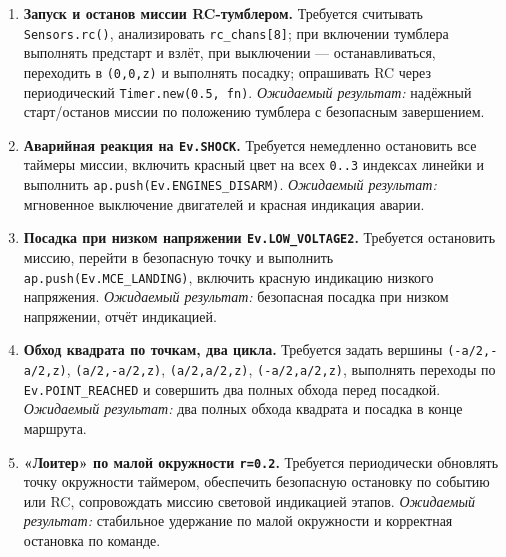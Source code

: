 \begin{enumerate}
  \item \textbf{Запуск и останов миссии RC-тумблером.}
    Требуется считывать \texttt{Sensors.rc()}, анализировать \texttt{rc\_chans[8]}; при включении тумблера выполнять предстарт и взлёт, при выключении — останавливаться, переходить в \texttt{(0,0,z)} и выполнять посадку; опрашивать RC через периодический \texttt{Timer.new(0.5, fn)}.
    \textit{Ожидаемый результат:} надёжный старт/останов миссии по положению тумблера с безопасным завершением.
  \item \textbf{Аварийная реакция на \texttt{Ev.SHOCK}.}
    Требуется немедленно остановить все таймеры миссии, включить красный цвет на всех \texttt{0..3} индексах линейки и выполнить \texttt{ap.push(Ev.ENGINES\_DISARM)}.
    \textit{Ожидаемый результат:} мгновенное выключение двигателей и красная индикация аварии.
  \item \textbf{Посадка при низком напряжении \texttt{Ev.LOW\_VOLTAGE2}.}
    Требуется остановить миссию, перейти в безопасную точку и выполнить \texttt{ap.push(Ev.MCE\_LANDING)}, включить красную индикацию низкого напряжения.
    \textit{Ожидаемый результат:} безопасная посадка при низком напряжении, отчёт индикацией.
  \item \textbf{Обход квадрата по точкам, два цикла.}
    Требуется задать вершины \texttt{(-a/2,-a/2,z)}, \texttt{(a/2,-a/2,z)}, \texttt{(a/2,a/2,z)}, \texttt{(-a/2,a/2,z)}, выполнять переходы по \texttt{Ev.POINT\_REACHED} и совершить два полных обхода перед посадкой.
    \textit{Ожидаемый результат:} два полных обхода квадрата и посадка в конце маршрута.
  \item \textbf{«Лоитер» по малой окружности \texttt{r=0.2}.}
    Требуется периодически обновлять точку окружности таймером, обеспечить безопасную остановку по событию или RC, сопровождать миссию световой индикацией этапов.
    \textit{Ожидаемый результат:} стабильное удержание по малой окружности и корректная остановка по команде.
\end{enumerate}

